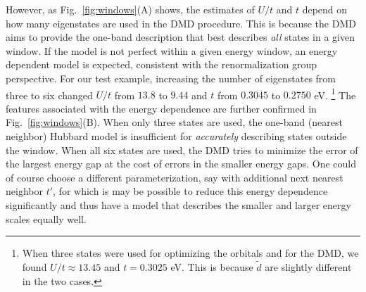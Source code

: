 However, as Fig.~\ref{fig:windows}(A) shows, the estimates of $U/t$ and $t$ depend on how many eigenstates 
are used in the DMD procedure. This is because the DMD aims to provide the one-band description 
that best describes \textit{all} states in a given window. If the model is not perfect within a given energy window, 
an energy dependent model is expected, consistent with the renormalization group perspective. For our test example, 
increasing the number of eigenstates from three to six changed $U/t$ from $13.8$ to $9.44$ and $t$ from $0.3045$ to $0.2750$ eV.
\footnote{When three states were used for optimizing the orbitals and for the DMD, we found $U/t\approx 13.45$ and $t=0.3025$ eV. 
This is because $\tilde{d}$ are slightly different in the two cases.} 
The features associated with the energy dependence are further confirmed in Fig.~\ref{fig:windows}(B). 
When only three states are used, the one-band (nearest neighbor) Hubbard model is insufficient for \textit{accurately}
describing states outside the window. When all six states are used, the DMD tries to minimize the error of the 
largest energy gap at the cost of errors in the smaller energy gaps. 
One could of course choose a different parameterization, say with additional next nearest neighbor $t'$, for which is 
may be possible to reduce this energy dependence significantly and thus have a model that describes the smaller 
and larger energy scales equally well.
 
 
